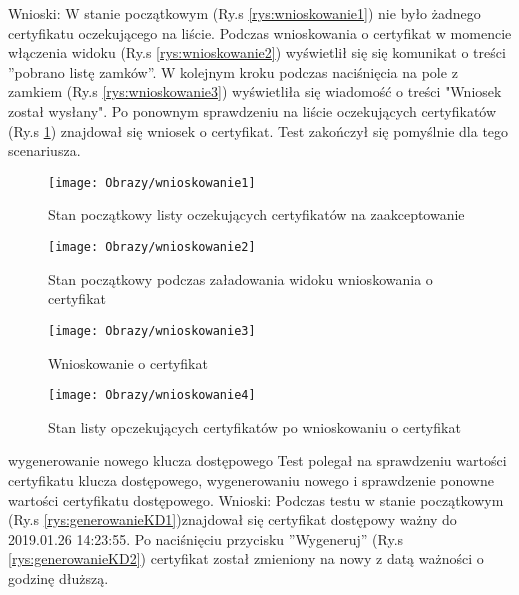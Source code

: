 \begin{enumerate*}
	Wnioski: W stanie początkowym (Ry.s \ref{rys:wnioskowanie1}) nie było żadnego certyfikatu oczekującego na liście. Podczas wnioskowania o certyfikat w momencie włączenia widoku (Ry.s \ref{rys:wnioskowanie2}) wyświetlił się  się komunikat o treści ''pobrano listę zamków''. W kolejnym kroku podczas naciśnięcia na pole z zamkiem (Ry.s \ref{rys:wnioskowanie3}) wyświetliła się wiadomość o treści "Wniosek został wysłany". Po ponownym sprawdzeniu na liście oczekujących certyfikatów (Ry.s \ref{rys:wnioskowanie4}) znajdował się wniosek o certyfikat. Test zakończył się pomyślnie dla tego scenariusza.
	
	
	\begin{figure}[ht!]

		\begin{minipage}{0.2\textwidth}
			\texttt{[image: Obrazy/wnioskowanie1]}
			\caption{Stan początkowy listy oczekujących certyfikatów na zaakceptowanie }
			\label{rys:wnioskowanie1}
		\end{minipage}
		\begin{minipage}{0.2\textwidth}
			\texttt{[image: Obrazy/wnioskowanie2]}
			\caption{Stan początkowy podczas załadowania widoku wnioskowania o certyfikat}
			\label{rys:wnioskowanie2}
		\end{minipage}
	
		\begin{minipage}{0.2\textwidth}
		\texttt{[image: Obrazy/wnioskowanie3]}
		\caption{Wnioskowanie o certyfikat}
		\label{rys:wnioskowanie3}
	\end{minipage}
	\begin{minipage}{0.2\textwidth}
		\texttt{[image: Obrazy/wnioskowanie4]}
		\caption{Stan listy opczekujących certyfikatów po wnioskowaniu o certyfikat}
		\label{rys:wnioskowanie4}
	\end{minipage}
	\end{figure}
	
	
	
	
	\item wygenerowanie nowego klucza dostępowego\newline
	Test polegał na sprawdzeniu wartości certyfikatu klucza dostępowego, wygenerowaniu nowego i sprawdzenie ponowne wartości certyfikatu dostępowego.
	Wnioski: Podczas testu w stanie początkowym (Ry.s \ref{rys:generowanieKD1})znajdował się certyfikat dostępowy ważny do 2019.01.26 14:23:55. Po naciśnięciu przycisku ''Wygeneruj''  (Ry.s \ref{rys:generowanieKD2}) certyfikat został zmieniony na nowy z datą ważności o godzinę dłuższą.
 

\end{enumerate*}
